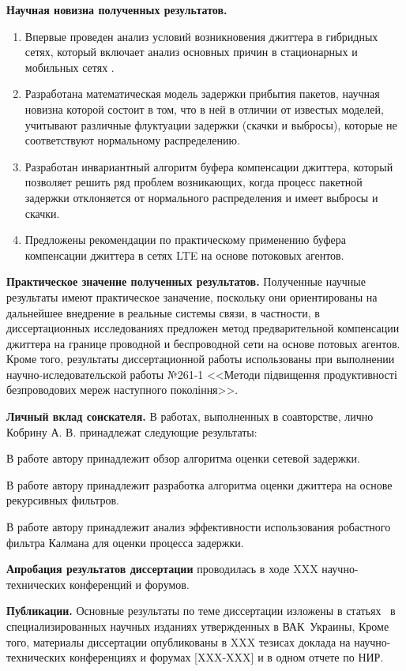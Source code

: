 \textbf{Научная новизна полученных результатов.} 
\begin{enumerate}
  \item Впервые проведен анализ условий возникновения джиттера в гибридных сетях, который включает анализ основных причин в стационарных и мобильных сетях .
  \item Разработана математическая модель задержки прибытия пакетов, научная новизна которой состоит в том, что в ней в отличии от известых моделей, учитывают различные флуктуации задержки (скачки и выбросы), которые не соответствуют нормальному распределению.
  \item Разработан инвариантный алгоритм буфера компенсации джиттера, который позволяет решить ряд проблем возникающих, когда процесс пакетной задержки отклоняется от нормального распределения и имеет выбросы и скачки.
  \item Предложены рекомендации по практическому применению буфера компенсации джиттера в сетях LTE на основе потоковых агентов.
\end{enumerate}

\textbf{Практическое значение полученных результатов.} Полученные научные результаты имеют практическое заначение, поскольку они ориентированы на дальнейшее внедрение в реальные системы связи, в частности, в диссертационных исследованиях предложен метод предварительной компенсации джиттера на границе проводной и беспроводной сети на основе потовых агентов.
Кроме того, результаты диссертационной работы использованы при выполнении научно-иследовательской работы №261-1 <<Методи підвищення продуктивності безпроводових мереж наступного покоління>>.


\textbf{Личный вклад соискателя.} В работах, выполненных в соавторстве, лично Кобрину А. В. принадлежат следующие результаты: 

В работе \cite{my1} автору принадлежит обзор алгоритма оценки сетевой задержки.

В работе \cite{my2} автору принадлежит разработка алгоритма оценки джиттера на основе рекурсивных фильтров.

В работе \cite{my4} автору принадлежит анализ эффективности использования робастного фильтра Калмана для оценки процесса задержки.

\textbf{Апробация результатов диссертации} проводилась в ходе XXX научно-технических конференций и форумов. 


\textbf{Публикации.} Основные результаты по теме диссертации изложены в статьях~\cite{my1,my2,my3,my4,my5} в специализированных научных изданиях утвержденных в ВАК~Украины, Кроме того, материалы диссертации опубликованы в XXX тезисах доклада на научно-технических конференциях и форумах [XXX-XXX] и в одном отчете по НИР.


\clearpage